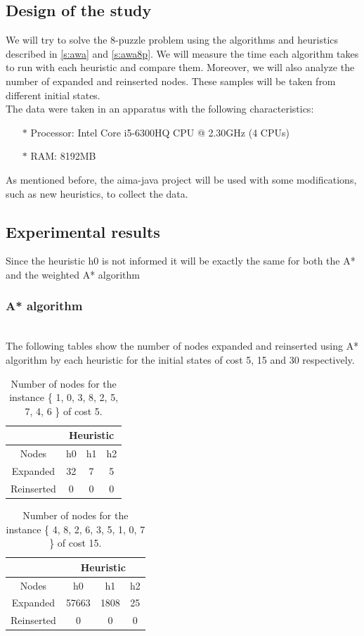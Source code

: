 \documentclass[runningheads]{llncs}
\begin{document}
\subsection{Design of the study}
We will try to solve the 8-puzzle problem using the algorithms and heuristics described in \ref{s:awa} and \ref{s:awa8p}. We will measure the time each algorithm takes to run with each heuristic and compare them. Moreover, we will also analyze the number of expanded and reinserted nodes. These samples will be taken from different initial states.
\\
The data were taken in an apparatus with the following characteristics:

\begin{itemize}
\item[$\ast$] Processor: Intel Core i5-6300HQ CPU @ 2.30GHz (4 CPUs)
\item[$\ast$] RAM: 8192MB
\end{itemize}
As mentioned before, the aima-java project will be used with some modifications, such as new heuristics, to collect the data.
\subsection{Experimental results}
Since the heuristic h0 is not informed it will be exactly the same for both the A* and the weighted A* algorithm
\subsubsection{A* algorithm}~\\
The following tables show the number of nodes expanded and reinserted using A* algorithm by each heuristic for the initial states of cost 5, 15 and 30 respectively.

\begin{table}[H]
    \centering
\caption{\label{tab:table1}Number of nodes for the instance \{ 1, 0, 3, 8, 2, 5, 7, 4, 6 \} of cost 5.}
    \begin{tabular}{|c|c|c|c|}
    \hline
       & \multicolumn{3}{|c|}{Heuristic} \\ \hline
        Nodes & h0 & h1 & h2 \\ \hline
        Expanded & 32 & 7 & 5 \\ \hline
        Reinserted & 0 & 0 & 0 \\ \hline
    \end{tabular}
\end{table}

\begin{table}[H]
    \centering
\caption{\label{tab:table2}Number of nodes for the instance \{ 4, 8, 2, 6, 3, 5, 1, 0, 7 \} of cost 15.}
    \begin{tabular}{|c|c|c|c|}
    \hline
       & \multicolumn{3}{|c|}{Heuristic} \\ \hline
        Nodes & h0 & h1 & h2 \\ \hline
        Expanded & 57663 & 1808 & 25 \\ \hline
        Reinserted & 0 & 0 & 0 \\ \hline
    \end{tabular}
\end{table}
\end{document}
